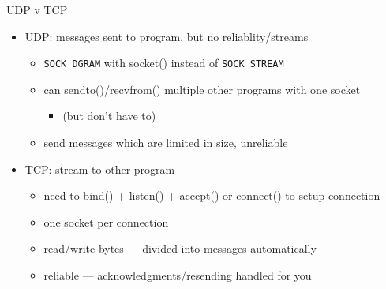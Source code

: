 \begin{frame}[fragile]{UDP v TCP}
    \begin{itemize}
    \item UDP: messages sent to program, but no reliablity/streams
        \begin{itemize}
        \item \texttt{SOCK\_DGRAM} with socket() instead of \texttt{SOCK\_STREAM}
        \item can sendto()/recvfrom() multiple other programs with one socket
            \begin{itemize}
            \item (but don't have to)
            \end{itemize}
        \item send messages which are limited in size, unreliable
        \end{itemize}
    \item TCP: stream to other program
        \begin{itemize}
        \item need to bind() + listen() + accept() or connect() to setup connection
        \item one socket per connection
        \item read/write bytes --- divided into messages automatically
        \item reliable --- acknowledgments/resending handled for you
        \end{itemize}
    \end{itemize}
\end{frame}
